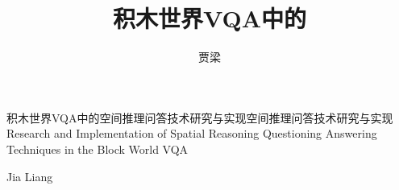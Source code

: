 \title{积木世界VQA中的}{积木世界VQA中的}{空间推理问答技术研究与实现}{空间推理问答技术研究与实现}{Research and Implementation of Spatial Reasoning Questioning Answering Techniques }{in the Block World VQA}
\author{贾梁}{Jia Liang}
\makebigcover
\makecover
